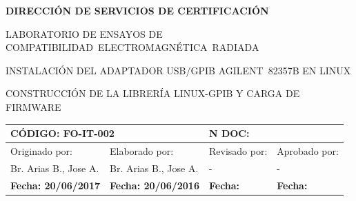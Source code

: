 \documentclass[paper=letter,oneside,fontsize=11pt, parskip=full]{scrartcl}
\begin{document}
			
		
		\begin{center}		
			
			\vspace{10cm}
			\begin{large}
				\bfseries
				\uppercase{Dirección de Servicios de Certificación}			
				\vspace{5pt}
				\begin{spacing}{0.9}
					\uppercase{Laboratorio de Ensayos de Compatibilidad~Electromagnética~Radiada}
				\end{spacing}
			\end{large}
			
			\vfill
			
			\begin{Large}
				\bfseries				
				\begin{spacing}{0.9}		
					\uppercase{Instalación del adaptador USB/GPIB Agilent~82357B en linux}
				\end{spacing}
			\end{Large}	
				
			\vspace{5pt}
			
			\begin{large}						
				\uppercase{Construcción de la librería linux-gpib y carga de firmware}
			\end{large}	
			
			\vfill
			
			\begin{table}[!h]
				\begin{tabularx}{\linewidth}{|X|X|X|X|}	
					\hline				
					\multicolumn{2}{|l|}{\textbf{CÓDIGO}: FO-IT-002} & \multicolumn{2}{l|}{\textbf{N DOC:}} \\
					\hline
					Originado por:	& 	Elaborado por: & 
					Revisado por: 	& 	Aprobado por: \\
					\hline
					Br. Arias B., Jose A. & Br. Arias B., Jose A. & - & - \\
					\hline
					\textbf{Fecha: 20/06/2017 } & 
					\textbf{Fecha: 20/06/2016} & 
					\textbf{Fecha: } &
					\textbf{Fecha: } \\				
					\hline
				\end{tabularx}	
			\end{table}	
			
			\vfill
		
		\end{center}
	
\end{document}
